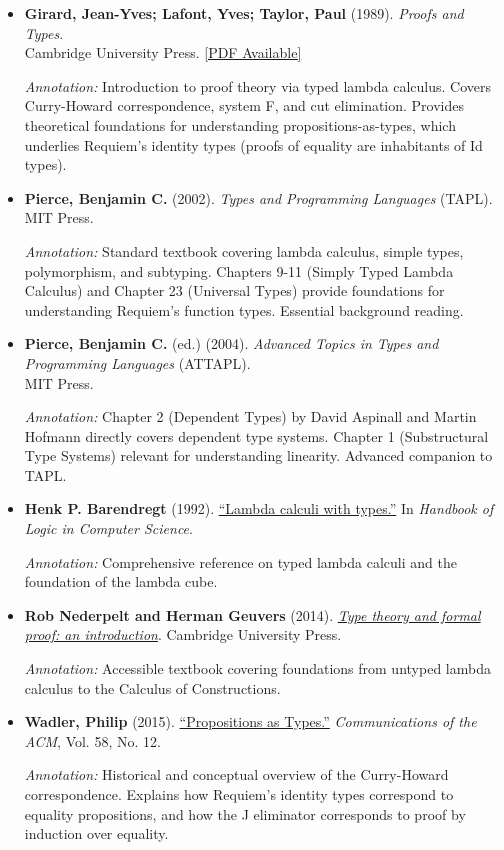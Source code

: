 \documentclass[11pt]{article}
\begin{document}
\begin{itemize}[leftmargin=*]
\item \textbf{Girard, Jean-Yves; Lafont, Yves; Taylor, Paul} (1989). \emph{Proofs and Types}.\\
Cambridge University Press. \href{http://www.paultaylor.eu/stable/prot.pdf}{[PDF Available]}

\textit{Annotation:} Introduction to proof theory via typed lambda calculus. Covers Curry-Howard correspondence, system F, and cut elimination. Provides theoretical foundations for understanding propositions-as-types, which underlies Requiem's identity types (proofs of equality are inhabitants of Id types).

\item \textbf{Pierce, Benjamin C.} (2002). \emph{Types and Programming Languages} (TAPL).\\
MIT Press.

\textit{Annotation:} Standard textbook covering lambda calculus, simple types, polymorphism, and subtyping. Chapters 9-11 (Simply Typed Lambda Calculus) and Chapter 23 (Universal Types) provide foundations for understanding Requiem's function types. Essential background reading.

\item \textbf{Pierce, Benjamin C.} (ed.) (2004). \emph{Advanced Topics in Types and Programming Languages} (ATTAPL).\\
MIT Press.

\textit{Annotation:} Chapter 2 (Dependent Types) by David Aspinall and Martin Hofmann directly covers dependent type systems. Chapter 1 (Substructural Type Systems) relevant for understanding linearity. Advanced companion to TAPL.

\item \textbf{Henk P. Barendregt} (1992). \href{https://pms.cs.ru.nl/james/RESEARCH/barendregt.pdf}{``Lambda calculi with types.''} In \emph{Handbook of Logic in Computer Science}.

\textit{Annotation:} Comprehensive reference on typed lambda calculi and the foundation of the lambda cube.

\item \textbf{Rob Nederpelt and Herman Geuvers} (2014). \href{https://doi.org/10.1017/CBO9781139013727}{\emph{Type theory and formal proof: an introduction}}. Cambridge University Press.

\textit{Annotation:} Accessible textbook covering foundations from untyped lambda calculus to the Calculus of Constructions.

\item \textbf{Wadler, Philip} (2015). \href{https://homepages.inf.ed.ac.uk/wadler/papers/propositions-as-types/propositions-as-types.pdf}{``Propositions as Types.''} \emph{Communications of the ACM}, Vol. 58, No. 12.

\textit{Annotation:} Historical and conceptual overview of the Curry-Howard correspondence. Explains how Requiem's identity types correspond to equality propositions, and how the J eliminator corresponds to proof by induction over equality.

\end{itemize}
\end{document}
